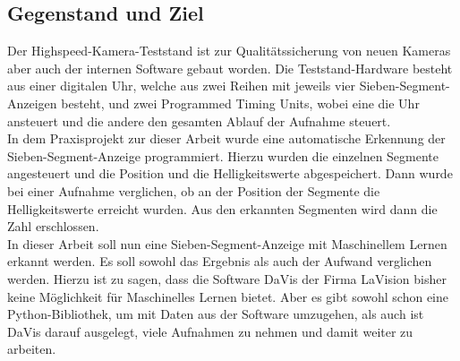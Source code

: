 \subsection{Gegenstand und Ziel}
Der Highspeed-Kamera-Teststand ist zur Qualitätssicherung von neuen Kameras aber auch der internen Software gebaut worden.   Die Teststand-Hardware besteht aus einer digitalen Uhr,  welche aus zwei Reihen mit jeweils vier Sieben-Segment-Anzeigen besteht, und zwei Programmed Timing Units,  wobei eine die Uhr ansteuert und die andere den gesamten Ablauf der Aufnahme steuert. \cite{Becker2021}\\
In dem Praxisprojekt zur dieser Arbeit wurde eine automatische Erkennung der Sieben-Segment-Anzeige programmiert. Hierzu wurden die einzelnen Segmente angesteuert und die Position und die Helligkeitswerte abgespeichert. Dann wurde bei einer Aufnahme verglichen, ob an der Position der Segmente die Helligkeitswerte erreicht wurden. Aus den erkannten Segmenten wird dann die Zahl erschlossen.\\
In dieser Arbeit soll nun eine Sieben-Segment-Anzeige mit Maschinellem Lernen erkannt werden. Es soll sowohl das Ergebnis als auch der Aufwand verglichen werden. Hierzu ist zu sagen, dass die Software DaVis der Firma LaVision bisher keine Möglichkeit für Maschinelles Lernen bietet.  Aber es gibt sowohl schon eine Python-Bibliothek, um mit Daten aus der Software umzugehen, als auch ist DaVis darauf ausgelegt, viele Aufnahmen zu nehmen und damit weiter zu arbeiten.

